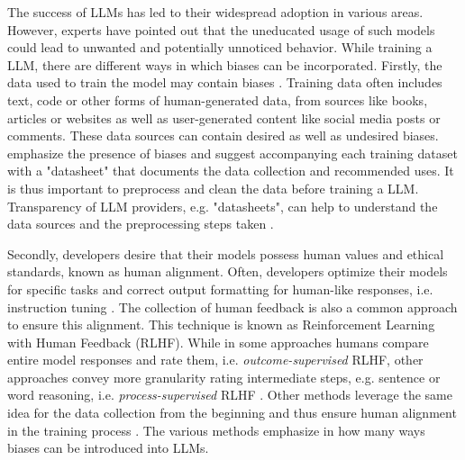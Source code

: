 \par The success of LLMs has led to their widespread adoption in various areas. However, experts have pointed out that the uneducated usage of such models could lead to unwanted and potentially unnoticed behavior. While training a LLM, there are different ways in which biases can be incorporated. Firstly, the data used to train the model may contain biases \parencite{bender2021dangers, naveed2023comprehensive, zhao2023survey}. Training data often includes text, code or other forms of human-generated data, from sources like books, articles or websites as well as user-generated content like social media posts or comments. These data sources can contain desired as well as undesired biases. \textcite{gebru2021datasheets} emphasize the presence of biases and suggest accompanying each training dataset with a "datasheet" that documents the data collection and recommended uses. It is thus important to preprocess and clean the data before training a LLM. Transparency of LLM providers, e.g. "datasheets", can help to understand the data sources and the preprocessing steps taken \parencite{naveed2023comprehensive, zhao2023survey}.

\par Secondly, developers desire that their models possess human values and ethical standards, known as human alignment. Often, developers optimize their models for specific tasks and correct output formatting for human-like responses, i.e. instruction tuning \parencite{zhao2023survey}. The collection of human feedback is also a common approach to ensure this alignment. This technique is known as Reinforcement Learning with Human Feedback (RLHF). While in some approaches humans compare entire model responses and rate them, i.e. \textit{outcome-supervised} RLHF, other approaches convey more granularity rating intermediate steps, e.g. sentence or word reasoning, i.e. \textit{process-supervised} RLHF \parencite{zhao2023survey}. Other methods leverage the same idea for the data collection from the beginning and thus ensure human alignment in the training process \parencite{ouyang2022training}. The various methods emphasize in how many ways biases can be introduced into LLMs.

